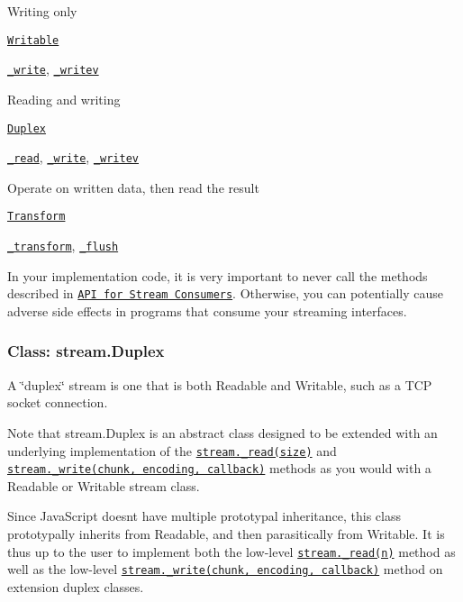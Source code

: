 Writing only

\href{#stream_class_stream_writable_1}{\tt Writable}

{\ttfamily \href{#stream_writable_write_chunk_encoding_callback_1}{\tt \+\_\+write}}, {\ttfamily \href{#stream_writable_writev_chunks_callback}{\tt \+\_\+writev}}

Reading and writing

\href{#stream_class_stream_duplex_1}{\tt Duplex}

{\ttfamily \href{#stream_readable_read_size_1}{\tt \+\_\+read}}, {\ttfamily \href{#stream_writable_write_chunk_encoding_callback_1}{\tt \+\_\+write}}, {\ttfamily \href{#stream_writable_writev_chunks_callback}{\tt \+\_\+writev}}

Operate on written data, then read the result

\href{#stream_class_stream_transform_1}{\tt Transform}

{\ttfamily \href{#stream_transform_transform_chunk_encoding_callback}{\tt \+\_\+transform}}, {\ttfamily \href{#stream_transform_flush_callback}{\tt \+\_\+flush}}

In your implementation code, it is very important to never call the methods described in \href{#stream_api_for_stream_consumers}{\tt A\+PI for Stream Consumers}. Otherwise, you can potentially cause adverse side effects in programs that consume your streaming interfaces.

\subsubsection*{Class\+: stream.\+Duplex}

A \char`\"{}duplex\char`\"{} stream is one that is both Readable and Writable, such as a T\+CP socket connection.

Note that {\ttfamily stream.\+Duplex} is an abstract class designed to be extended with an underlying implementation of the \href{#stream_readable_read_size_1}{\tt {\ttfamily stream.\+\_\+read(size)}} and \href{#stream_writable_write_chunk_encoding_callback_1}{\tt {\ttfamily stream.\+\_\+write(chunk, encoding, callback)}} methods as you would with a Readable or Writable stream class.

Since Java\+Script doesn\textquotesingle{}t have multiple prototypal inheritance, this class prototypally inherits from Readable, and then parasitically from Writable. It is thus up to the user to implement both the low-\/level \href{#stream_readable_read_size_1}{\tt {\ttfamily stream.\+\_\+read(n)}} method as well as the low-\/level \href{#stream_writable_write_chunk_encoding_callback_1}{\tt {\ttfamily stream.\+\_\+write(chunk, encoding, callback)}} method on extension duplex classes.

